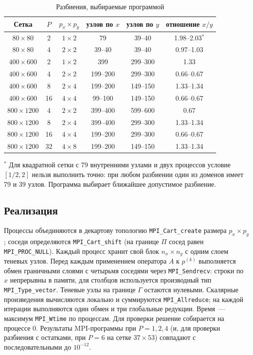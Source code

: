 \documentclass[12pt,a4paper]{article}
\begin{document}
\begin{table}[H]\centering
\caption{Разбиения, выбираемые программой}
\begin{tabular}{cccccc}\toprule
Сетка & $P$ & $p_x\times p_y$ & узлов по $x$ & узлов по $y$ & отношение $x/y$ \\\midrule
$80\times80$ & 2 & $1\times2$ & 79 & 39--40 & 1.98--2.03$^*$ \\
$80\times80$ & 4 & $2\times2$ & 39--40 & 39--40 & 0.97--1.03 \\
$400\times600$ & 2 & $1\times2$ & 399 & 299--300 & 1.33 \\
$400\times600$ & 4 & $2\times2$ & 199--200 & 299--300 & 0.66--0.67 \\
$400\times600$ & 8 & $2\times4$ & 199--200 & 149--150 & 1.33--1.34 \\
$400\times600$ & 16 & $4\times4$ & 99--100 & 149--150 & 0.66--0.67 \\
$800\times1200$ & 4 & $2\times2$ & 399--400 & 599--600 & 0.67 \\
$800\times1200$ & 8 & $2\times4$ & 399--400 & 299--300 & 1.33--1.34 \\
$800\times1200$ & 16 & $4\times4$ & 199--200 & 299--300 & 0.66--0.67 \\
$800\times1200$ & 32 & $4\times8$ & 199--200 & 149--150 & 1.33--1.34 \\\bottomrule
\end{tabular}

\smallskip
\small $^*$ Для квадратной сетки с 79 внутренними узлами и двух процессов условие $[1/2,2]$
нельзя выполнить точно: при любом разбиении один из доменов имеет 79 и 39 узлов.
Программа выбирает ближайшее допустимое разбиение.
\end{table}

\subsection*{Реализация}
Процессы объединяются в декартову топологию \texttt{MPI\_Cart\_create} размера
$p_x\times p_y$; соседи определяются \texttt{MPI\_Cart\_shift} (на границе $\Pi$ сосед
равен \texttt{MPI\_PROC\_NULL}). Каждый процесс хранит свой блок $n_x\times n_y$ с одним слоем
теневых узлов. Перед каждым применением оператора $A$ к $p^{(k)}$ выполняется обмен
граничными слоями с четырьмя соседями через \texttt{MPI\_Sendrecv}: строки по $x$
непрерывны в памяти, для столбцов используется производный тип \texttt{MPI\_Type\_vector}.
Теневые узлы на границе $\Gamma$ остаются нулевыми. Скалярные произведения вычисляются
локально и суммируются \texttt{MPI\_Allreduce}; на каждой итерации выполняются один обмен
и три глобальные редукции. Время~--- максимум \texttt{MPI\_Wtime} по процессам.
Для проверки решение собирается на процессе 0. Результаты MPI-программы при $P=1,2,4$ (и,
для проверки разбиения с остатками, при $P=6$ на сетке $37\times53$) совпадают с
последовательными до $10^{-12}$.
\end{document}
